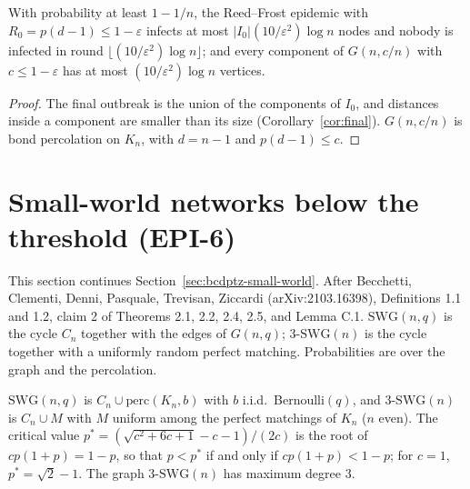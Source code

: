 \begin{corollary}\label{cor:subcritical}
\leanok{}
With probability at least $1 - 1/n$, the Reed--Frost epidemic with $R_0 = p(d-1) \le 1 -
\varepsilon$ infects at most $|I_0| (10/\varepsilon^2)\log n$ nodes and nobody is infected in round
$\lfloor (10/\varepsilon^2)\log n \rfloor$; and every component of $G(n, c/n)$ with
$c \le 1 - \varepsilon$ has at most $(10/\varepsilon^2)\log n$ vertices.
\end{corollary}
\begin{proof}\leanok
The final outbreak is the union of the components of $I_0$, and distances inside a component are
smaller than its size (Corollary~\ref{cor:final}). $G(n, c/n)$ is bond percolation on $K_n$, with
$d = n - 1$ and $p(d-1) \le c$.
\end{proof}

\section{Small-world networks below the threshold (EPI-6)}
This section continues Section~\ref{sec:bcdptz-small-world}.
After Becchetti, Clementi, Denni, Pasquale, Trevisan, Ziccardi (arXiv:2103.16398), Definitions
1.1 and 1.2, claim 2 of Theorems 2.1, 2.2, 2.4, 2.5, and Lemma C.1. $\mathrm{SWG}(n, q)$ is the
cycle $C_n$ together with the edges of $G(n, q)$; $3\text{-}\mathrm{SWG}(n)$ is the cycle together
with a uniformly random perfect matching. Probabilities are over the graph and the percolation.

\begin{definition}\label{def:swg}
\leanok{}
$\mathrm{SWG}(n, q)$ is $C_n \cup \mathrm{perc}(K_n, b)$ with $b$ i.i.d.\ Bernoulli$(q)$, and
$3\text{-}\mathrm{SWG}(n)$ is $C_n \cup M$ with $M$ uniform among the perfect matchings of $K_n$ ($n$
even). The critical value $p^* = (\sqrt{c^2+6c+1} - c - 1)/(2c)$ is the root of $c p (1 + p) =
1 - p$, so that $p < p^*$ if and only if $c p(1+p) < 1-p$; for $c = 1$, $p^* = \sqrt 2 - 1$. The
graph $3\text{-}\mathrm{SWG}(n)$ has maximum degree $3$.
\end{definition}


